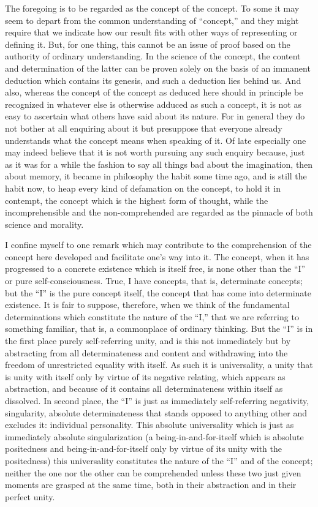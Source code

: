 The foregoing is to be regarded as
the concept of the concept.
To some it may seem to depart
from the common understanding of “concept,”
and they might require that we indicate
how our result fits with other ways
of representing or defining it.
But, for one thing, this cannot be
an issue of proof based on the
authority of ordinary understanding.
In the science of the concept,
the content and determination of the latter
can be proven solely on the basis
of an immanent deduction which contains its genesis,
and such a deduction lies behind us.
And also, whereas the concept of the concept
as deduced here should in principle
be recognized in whatever else
is otherwise adduced as such a concept,
it is not as easy to ascertain what
others have said about its nature.
For in general they do not bother at all
enquiring about it but presuppose
that everyone already understands what
the concept means when speaking of it.
Of late especially one may indeed
believe that it is not worth pursuing
any such enquiry because, just as it was
for a while the fashion to say all things bad
about the imagination, then about memory,
it became in philosophy the habit some time ago,
and is still the habit now,
to heap every kind of defamation on the concept,
to hold it in contempt,
the concept which is the highest form of thought,
while the incomprehensible and the non-comprehended are
regarded as the pinnacle of both science and morality.

I confine myself to one remark which may contribute
to the comprehension of the concept here developed
and facilitate one's way into it.
The concept, when it has progressed to
a concrete existence which is itself free,
is none other than the “I” or pure self-consciousness.
True, I have concepts, that is, determinate concepts;
but the “I” is the pure concept itself,
the concept that has come into determinate existence.
It is fair to suppose, therefore,
when we think of the fundamental determinations
which constitute the nature of the “I,”
that we are referring to something familiar,
that is, a commonplace of ordinary thinking.
But the “I” is in the first place purely self-referring unity,
and is this not immediately but by abstracting
from all determinateness and content
and withdrawing into the freedom
of unrestricted equality with itself.
As such it is universality, a unity that
is unity with itself only by virtue of its negative relating,
which appears as abstraction,
and because of it contains all determinateness
within itself as dissolved.
In second place, the “I” is just as immediately
self-referring negativity, singularity,
absolute determinateness that stands opposed
to anything other and excludes it:
individual personality.
This absolute universality which is just as
immediately absolute singularization
(a being-in-and-for-itself which is absolute positedness
and being-in-and-for-itself only by virtue of
its unity with the positedness)
this universality constitutes the
nature of the “I” and of the concept;
neither the one nor the other can be comprehended
unless these two just given moments are grasped at the same time,
both in their abstraction and in their perfect unity.

